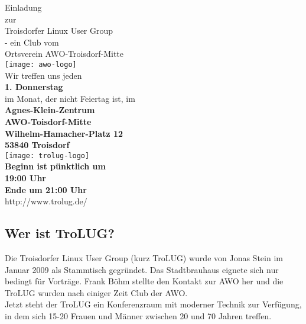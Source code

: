 \documentclass[a4paper,11pt,notumble]{leaflet}
\begin{document}
 
\newenvironment{pandora}{\fontfamily{pnb10}\selectfont}{}
\newenvironment{panfett}{\fontfamily{pnss10}\selectfont}{}
\newenvironment{ebmr}{\fontfamily{ebmr10}\selectfont}{}
\newenvironment{anb}{\fontfamily{anb10u}\selectfont}{}
\setlength{\fboxsep}{0.2cm}  %
\setlength{\parindent}{0pt}  %

\newcommand{\VT}[3]{{\tt #1} \textsl{#2} {\bf #3}\\[2mm]}



\begin{center}
\Huge{\sc Einladung}\\[3mm]
{\small zur}\\[1mm]
\large{\sc Troisdorfer Linux User Group}\\[1mm]
{\small - ein Club vom}\\[1mm]
\large{\sc Ortsverein AWO-Troisdorf-Mitte} \\[1mm] 
  \texttt{[image: awo-logo]}\\[5mm]
{\large Wir treffen uns jeden} \\[0mm]

  \textbf{\Huge{1. Donnerstag\\[2mm] }} %
  im Monat, der nicht Feiertag ist, im\\[5mm]
 \textbf{\sc Agnes-Klein-Zentrum\\[2mm]
AWO-Toisdorf-Mitte\\
Wilhelm-Hamacher-Platz 12\\
53840 Troisdorf\\[5mm]}
 \texttt{[image: trolug-logo]}\\[4mm]
\textbf{\large{Beginn ist pünktlich um\\[1mm]}}
\textbf{\Huge{19:00 Uhr}} \\[1mm]
\textbf{\large{Ende um 21:00 Uhr}}\\[2mm]
\textsf{\large http://www.trolug.de/ }\\[2mm]
\end{center}

\vfill
\subsection{Wer ist TroLUG?}
Die {\sc Troisdorfer Linux User Group} (kurz TroLUG) wurde von Jonas Stein im Januar 2009 als Stammtisch gegründet. 
Das Stadtbrauhaus eignete sich nur bedingt für Vorträge. Frank Böhm stellte den Kontakt zur AWO her und die TroLUG wurden nach einiger Zeit Club der AWO.\\
Jetzt steht der TroLUG ein Konferenzraum mit moderner Technik zur Verfügung, in dem sich 15-20 Frauen und Männer zwischen 20 und 70 Jahren treffen.
\end{document}
